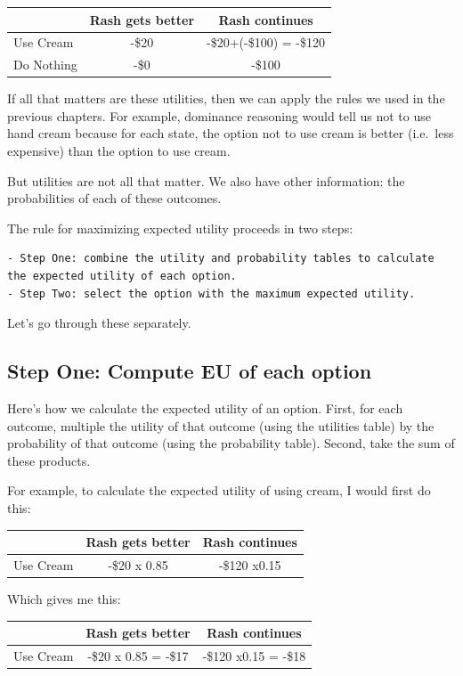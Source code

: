 \documentclass[]{tufte-book}
\begin{document}
\begin{longtable}[]{@{}lcc@{}}
\toprule
& Rash gets better & Rash continues\tabularnewline
\midrule
\endhead
Use Cream & -\$20 & -\$20+(-\$100) = -\$120\tabularnewline
Do Nothing & -\$0 & -\$100\tabularnewline
\bottomrule
\end{longtable}

If all that matters are these utilities, then we can apply the rules we used in the previous chapters. For example, dominance reasoning would tell us not to use hand cream because for each state, the option not to use cream is better (i.e.~less expensive) than the option to use cream.

But utilities are not all that matter. We also have other information: the probabilities of each of these outcomes.

The rule for maximizing expected utility proceeds in two steps:

\begin{verbatim}
- Step One: combine the utility and probability tables to calculate the expected utility of each option. 
- Step Two: select the option with the maximum expected utility. 
\end{verbatim}

Let's go through these separately.

\hypertarget{step-one-compute-eu-of-each-option}{%
\subsection{Step One: Compute EU of each option}\label{step-one-compute-eu-of-each-option}}

Here's how we calculate the expected utility of an option. First, for each outcome, multiple the utility of that outcome (using the utilities table) by the probability of that outcome (using the probability table). Second, take the sum of these products.

For example, to calculate the expected utility of using cream, I would first do this:

\begin{longtable}[]{@{}lcc@{}}
\toprule
& Rash gets better & Rash continues\tabularnewline
\midrule
\endhead
Use Cream & -\$20 x 0.85 & -\$120 x0.15\tabularnewline
\bottomrule
\end{longtable}

Which gives me this:

\begin{longtable}[]{@{}lcc@{}}
\toprule
& Rash gets better & Rash continues\tabularnewline
\midrule
\endhead
Use Cream & -\$20 x 0.85 = -\$17 & -\$120 x0.15 = -\$18\tabularnewline
\bottomrule
\end{longtable}
\end{document}
